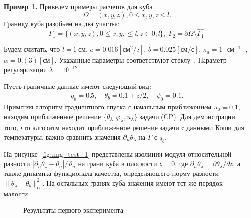 \textbf{Пример 1.}
Приведем примеры расчетов для куба
\[
    \Omega = {(x, y, z), 0 \leq x,y,z \leq l}.
\]
Границу куба разобьём на два участка:
\[
    \Gamma_1 = \{(x, y, z), 0 \leq x,y, \leq l, z \in 0, l\}, \;
    \Gamma_2 = \partial \Omega \setminus \hat{\Gamma_1}.
\]

Будем считать, что $l=1~\text{см}$, $a = 0.006[\text{см}^2/\text{c}]$,
$b=0.025[\text{см}/\text{с}]$,
$\kappa_a=1[\text{см}^{-1}]$, $\alpha = 0.(3)[\text{см}]$.
Указанные параметры соответствуют стеклу~\cite{Grenkin5}.
Параметр регуляризации $\lambda=10^{-12}$.

Пусть граничные данные имеют следующий вид:
\begin{gather*}
    q_b = 0.5, \quad
    \theta_b = 0.1 + z/2, \quad
    \psi_0 = 0.1.
\end{gather*}
Применяя алгоритм градиентного спуска
с начальным приближением $u_0 = 0.1$, находим приближенное решение
$\{\theta_\lambda,\varphi_\lambda,u_\lambda\}$ задачи (CP)\@.
Для демонстрации того, что алгоритм находит приближенное решение задачи с данными
Коши для температуры, важно сравнить значения $\partial_n\theta_\lambda$ на $\Gamma$ с $q_b$.

На рисунке~\ref{fig:img_test_1} представлены изолинии модуля относительной разности
$|\partial_n\theta_\lambda-\theta_n|/\ \theta_n$
на грани куба в плоскости $z=0$, где
$\partial_n\theta_\lambda=\partial\theta_\lambda/\partial z$,
а также динамика функционала качества, определяющего
норму разности $\|\theta_\lambda -\theta_b\|^2_U$.
На остальных гранях куба значения имеют тот же порядок малости.

\begin{figure}[H]
    \centering
    \caption{Результаты первого эксперимента}
    \label{fig:1}
\end{figure}


